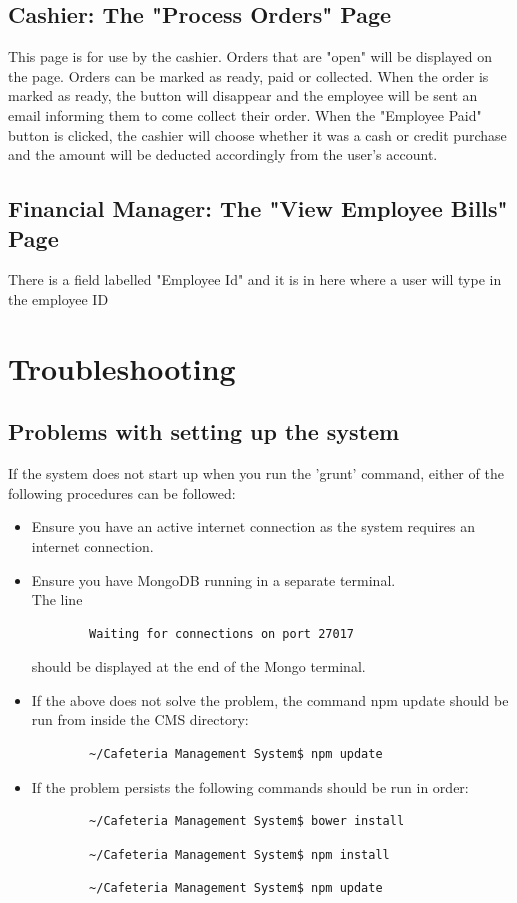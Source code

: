 \documentclass[a4paper,12pt]{article}
\begin{document}
\subsection{Cashier: The "Process Orders" Page}
This page is for use by the cashier. Orders that are "open" will be displayed on the page. Orders can be marked as ready, paid or collected. When the order is marked as ready, the button will disappear and the employee will be sent an email informing them to come collect their order. When the "Employee Paid" button is clicked, the cashier will choose whether it was a cash or credit purchase and the amount will be deducted accordingly from the user's account.

\subsection{Financial Manager: The "View Employee Bills" Page}
There is a field labelled "Employee Id" and it is in here where a user will type in the employee ID 

\section{Troubleshooting}
\subsection{Problems with setting up the system}
If the system does not start up when you run the 'grunt' command, either of the following procedures can be followed:
\begin{itemize}
\item Ensure you have an active internet connection as the system requires an internet connection.
\item Ensure you have MongoDB running in a separate terminal. \\
	The line \begin{verbatim}
		Waiting for connections on port 27017
	\end{verbatim} should be displayed at the end of the Mongo terminal.
\item If the above does not solve the problem, the command npm update should be run from inside the CMS directory:
	\begin{verbatim}
		~/Cafeteria Management System$ npm update
	\end{verbatim}
\item If the problem persists the following commands should be run in order:
	\begin{verbatim}
		~/Cafeteria Management System$ bower install
	\end{verbatim} 
	\begin{verbatim}
		~/Cafeteria Management System$ npm install
	\end{verbatim} 
	\begin{verbatim}
		~/Cafeteria Management System$ npm update
	\end{verbatim}
\end{itemize}
\end{document}
